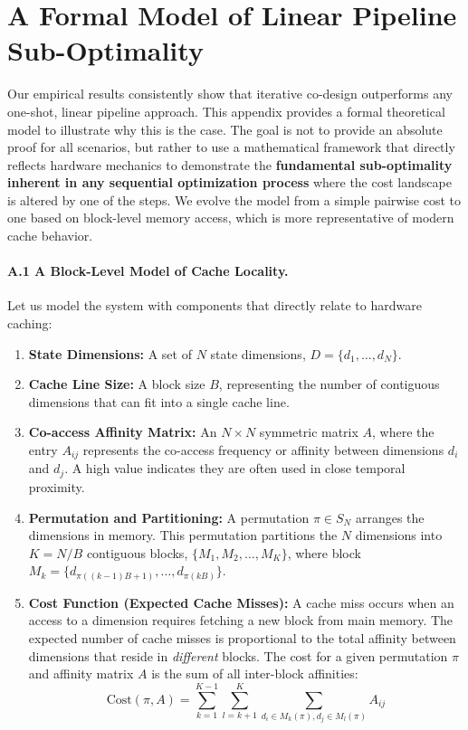 \documentclass{article}
\begin{document}



\newpage
\appendix

\section{A Formal Model of Linear Pipeline Sub-Optimality}
\label{app:theoretical_model}

Our empirical results consistently show that iterative co-design outperforms any one-shot, linear pipeline approach. This appendix provides a formal theoretical model to illustrate why this is the case. The goal is not to provide an absolute proof for all scenarios, but rather to use a mathematical framework that directly reflects hardware mechanics to demonstrate the \textbf{fundamental sub-optimality inherent in any sequential optimization process} where the cost landscape is altered by one of the steps. We evolve the model from a simple pairwise cost to one based on block-level memory access, which is more representative of modern cache behavior.

\paragraph{A.1 A Block-Level Model of Cache Locality.}
Let us model the system with components that directly relate to hardware caching:
\begin{enumerate}
    \item \textbf{State Dimensions:} A set of $N$ state dimensions, $D = \{d_1, \dots, d_N\}$.
    \item \textbf{Cache Line Size:} A block size $B$, representing the number of contiguous dimensions that can fit into a single cache line.
    \item \textbf{Co-access Affinity Matrix:} An $N \times N$ symmetric matrix $A$, where the entry $A_{ij}$ represents the co-access frequency or affinity between dimensions $d_i$ and $d_j$. A high value indicates they are often used in close temporal proximity.
    \item \textbf{Permutation and Partitioning:} A permutation $\pi \in S_N$ arranges the dimensions in memory. This permutation partitions the $N$ dimensions into $K = N/B$ contiguous blocks, $\{M_1, M_2, \dots, M_K\}$, where block $M_k = \{d_{\pi((k-1)B+1)}, \dots, d_{\pi(kB)}\}$.
    \item \textbf{Cost Function (Expected Cache Misses):} A cache miss occurs when an access to a dimension requires fetching a new block from main memory. The expected number of cache misses is proportional to the total affinity between dimensions that reside in \textit{different} blocks. The cost for a given permutation $\pi$ and affinity matrix $A$ is the sum of all inter-block affinities:
    \begin{equation}
    \label{eq:cost_block}
        \text{Cost}(\pi, A) = \sum_{k=1}^{K-1} \sum_{l=k+1}^{K} \sum_{d_i \in M_k(\pi), d_j \in M_l(\pi)} A_{ij}
    \end{equation}
\end{enumerate}
\end{document}
